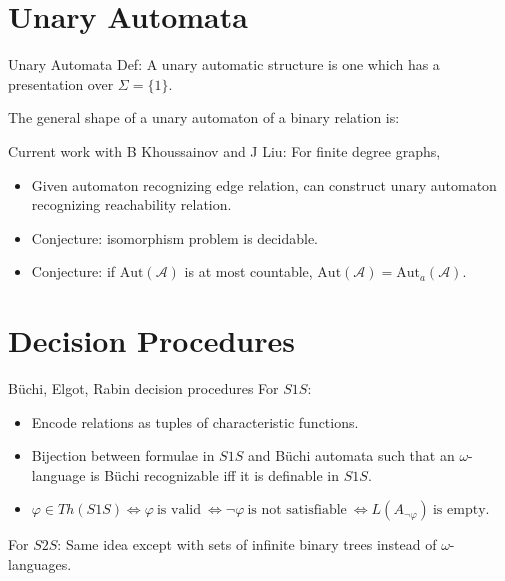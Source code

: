 \documentclass[style=fyma
 ]{powerdot}
\begin{document}
\section{Unary Automata}

\begin{slide}{Unary Automata}
  Def: A unary automatic structure is one which has a presentation over $\Sigma = \{ 1\}$.

  The general shape of a unary automaton of a binary relation is:
\vspace{-15pt}
\begin{figure}[h]
\begin{center}
\end{center}
\end{figure}
\vspace{-20pt}
  Current work with B Khoussainov and J Liu: For finite degree graphs,
  \begin{itemize}
  \vspace{-5pt}
  \item Given automaton recognizing edge relation, can construct unary automaton recognizing reachability relation.
  \item Conjecture: isomorphism problem is decidable.
  \item Conjecture: if $\text{Aut}(\mathcal{A})$ is at most countable, $\text{Aut}(\mathcal{A}) = {\text{Aut}}_{a}(\mathcal{A})$.
  \end{itemize}
\end{slide}

\section{Decision Procedures}

\begin{slide}{B\"uchi, Elgot, Rabin decision procedures}
  For $S1S$:
  \begin{itemize}
    \item Encode relations as tuples of characteristic functions.
    \item Bijection between formulae in $S1S$ and B\"uchi automata such that an $\omega$-language is B\"uchi recognizable iff it is definable in $S1S$.
    \item $\varphi \in Th(S1S) \iff \varphi~\text{is valid} ~\iff \neg \varphi ~\text{is not satisfiable} ~\iff L(A_{\neg \varphi}) ~\text{is empty}$.
  \end{itemize}
  
  \bigskip
  
  For $S2S$: Same idea except with sets of infinite binary trees instead of $\omega$-languages.
\end{slide}
\end{document}

